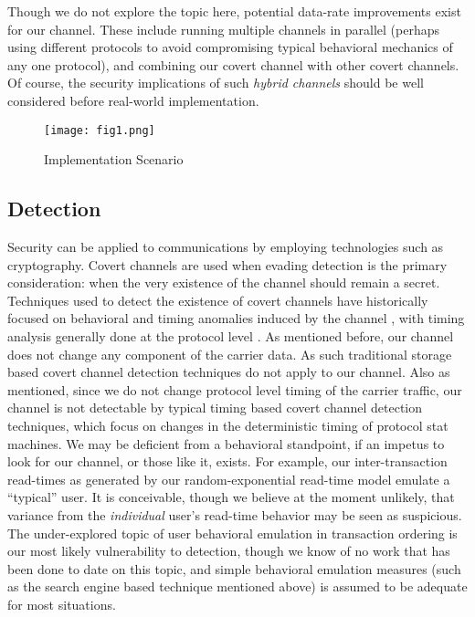\documentclass[10pt, conference]{IEEEtran}
\begin{document}
Though we do not explore the topic here, potential data-rate improvements exist for our channel.  These include running multiple channels in parallel (perhaps using different protocols to avoid compromising typical behavioral mechanics of any one protocol), and combining our covert channel with other covert channels.  Of course, the security implications of such {\em hybrid channels} should be well considered before real-world implementation.

\begin{figure*}[ht]
  \centering
    \texttt{[image: fig1.png]}
  \caption{Implementation Scenario}
\end{figure*}

\subsection{Detection}
Security can be applied to communications by employing technologies such as cryptography.  Covert channels are used when evading detection is the primary consideration: when the very existence of the channel should remain a secret.  Techniques used to detect the existence of covert channels have historically focused on behavioral and timing anomalies induced by the channel \cite{Cabuk09} \cite{Goher12}, with timing analysis generally done at the protocol level \cite{Cabuk04} \cite{Gianvecchio11} \cite{Giles02} \cite{Luo08} \cite{Tumoian05}.  As mentioned before, our channel does not change any component of the carrier data.  As such traditional storage based covert channel detection techniques do not apply to our channel.  Also as mentioned, since we do not change protocol level timing of the carrier traffic, our channel is not detectable by typical timing based covert channel detection techniques, which focus on changes in the deterministic timing of protocol stat machines.  We may be deficient from a behavioral standpoint, if an impetus to look for our channel, or those like it, exists.  For example, our inter-transaction read-times as generated by our random-exponential read-time model emulate a ``typical'' user.  It is conceivable, though we believe at the moment unlikely, that variance from the {\em individual} user's read-time behavior may be seen as suspicious.  The under-explored topic of user behavioral emulation in transaction ordering is our most likely vulnerability to detection, though we know of no work that has been done to date on this topic, and simple behavioral emulation measures (such as the search engine based technique mentioned above) is assumed to be adequate for most situations.
\end{document}
